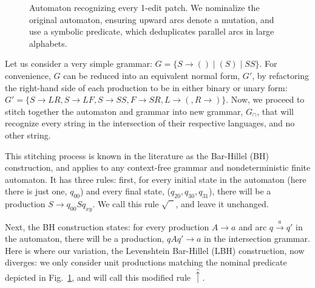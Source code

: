 \documentclass[runningheads]{llncs}
\begin{document}
\begin{figure}[h!]
{
  }
  \caption{Automaton recognizing every 1-edit patch. We nominalize the original automaton, ensuring upward arcs denote a mutation, and use a symbolic predicate, which deduplicates parallel arcs in large alphabets.}\label{fig:lev_automaton}\vspace{-5pt}
\end{figure}

Let us consider a very simple grammar: $G = \{S \rightarrow ( ) \mid ( S ) \mid S S\}$. For convenience, $G$ can be reduced into an equivalent normal form, $G'$, by refactoring the right-hand side of each production to be in either binary or unary form: $G'= \{S \rightarrow L R, S \rightarrow L F, S \rightarrow S S, F \rightarrow S R, L \rightarrow (, R \rightarrow )\}$. Now, we proceed to stitch together the automaton and grammar into new grammar, $G_\cap$, that will recognize every string in the intersection of their respective languages, and no other string.

This stitching process is known in the literature as the Bar-Hillel (BH) construction, and applies to any context-free grammar and nondeterministic finite automaton. It has three rules: first, for every initial state in the automaton (here there is just one, $q_{00}$) and every final state, ($q_{20}, q_{30}, q_{31}$), there will be a production $S\rightarrow q_{00}Sq_{xy}$. We call this rule $\sqrt{\phantom{S}}$, and leave it unchanged.

Next, the BH construction states: for every production $A\rightarrow a$ and arc $q \overset{a}{\rightarrow} q'$ in the automaton, there will be a production, $qAq'\rightarrow a$ in the intersection grammar. Here is where our variation, the Levenshtein Bar-Hillel (LBH) construction, now diverges: we only consider unit productions matching the nominal predicate depicted in Fig.~\ref{fig:lev_automaton}, and will call this modified rule $\hat\uparrow$.
\end{document}
